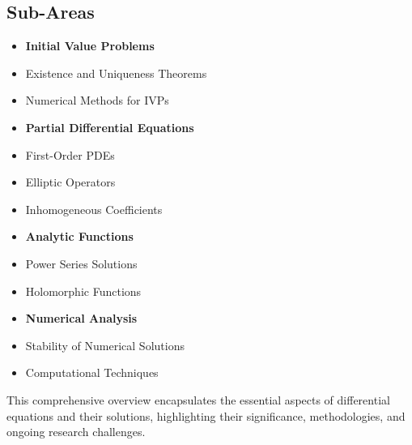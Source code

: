 \documentclass[11pt,a4paper]{article}
\begin{document}
\subsection{Sub-Areas}
\begin{itemize}
\item \textbf{Initial Value Problems}
\item Existence and Uniqueness Theorems
\item Numerical Methods for IVPs
\item \textbf{Partial Differential Equations}
\item First-Order PDEs
\item Elliptic Operators
\item Inhomogeneous Coefficients
\item \textbf{Analytic Functions}
\item Power Series Solutions
\item Holomorphic Functions
\item \textbf{Numerical Analysis}
\item Stability of Numerical Solutions
\item Computational Techniques
\end{itemize}

This comprehensive overview encapsulates the essential aspects of differential equations and their solutions, highlighting their significance, methodologies, and ongoing research challenges.
\end{document}
